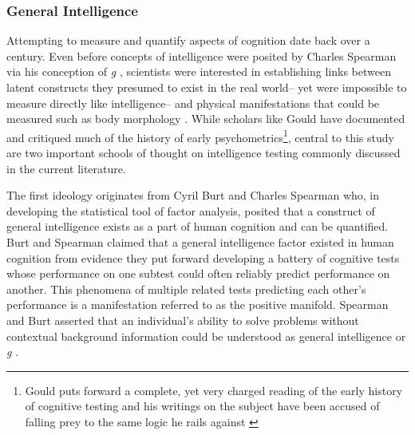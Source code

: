 \documentclass[12pt,]{book}
\let\rmarkdownfootnote\footnote%
\def\footnote{\protect\rmarkdownfootnote}
\begin{document}
\hypertarget{general-intelligence}{%
\subsubsection{General Intelligence}\label{general-intelligence}}

Attempting to measure and quantify aspects of cognition date back over a century.
Even before concepts of intelligence were posited by Charles Spearman via his conception of \emph{g} \citep{spearmanGeneralIntelligenceObjectively1904}, scientists were interested in establishing links between latent constructs they presumed to exist in the real world-- yet were impossible to measure directly like intelligence-- and physical manifestations that could be measured such as body morphology \citep{gouldMismeasureMan1996}.
While scholars like Gould have documented and critiqued much of the history of early psychometrics\footnote{Gould puts forward a complete, yet very charged reading of the early history of cognitive testing and his writings on the subject have been accused of falling prey to the same logic he rails against \citep{warneStephenJayGould2019}}, central to this study are two important schools of thought on intelligence testing commonly discussed in the current literature.

The first ideology originates from Cyril Burt and Charles Spearman who, in developing the statistical tool of factor analysis, posited that a construct of general intelligence exists as a part of human cognition and can be quantified.
Burt and Spearman claimed that a general intelligence factor existed in human cognition from evidence they put forward developing a battery of cognitive tests whose performance on one subtest could often reliably predict performance on another.
This phenomena of multiple related tests predicting each other's performance is a manifestation referred to as the positive manifold.
Spearman and Burt asserted that an individual's ability to solve problems without contextual background information could be understood as general intelligence or \emph{g} \citep{spearmanGeneralIntelligenceObjectively1904}.
\end{document}
